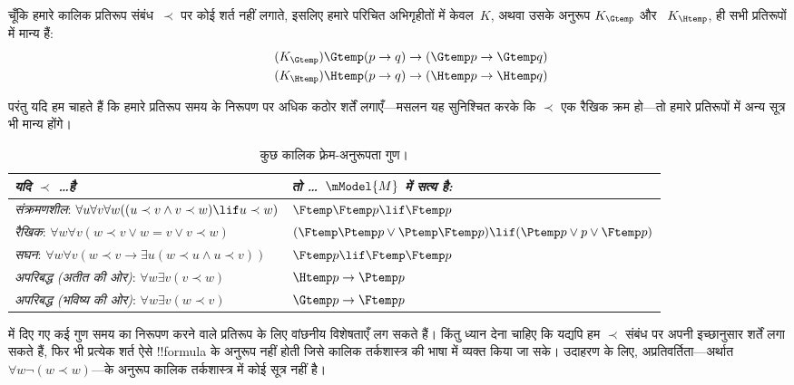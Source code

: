 \documentclass[../../../include/open-logic-section]{subfiles}
\begin{document}


चूँकि हमारे कालिक प्रतिरूप संबंध~$\prec$ पर कोई शर्त नहीं लगाते, इसलिए हमारे
परिचित अभिगृहीतों में केवल~$K$, अथवा उसके अनुरूप $K_{\Gtemp}$ और
~$K_{\Htemp}$, ही सभी प्रतिरूपों में मान्य हैं:
\begin{align*}
\tag{$K_{\Gtemp}$}  \Gtemp (p \to q) & \to (\Gtemp p \to \Gtemp q)\\
\tag{$K_{\Htemp}$}  \Htemp (p \to q) & \to (\Htemp p \to \Htemp q)
\end{align*}

परंतु यदि हम चाहते हैं कि हमारे प्रतिरूप समय के निरूपण पर अधिक कठोर शर्तें
लगाएँ---मसलन यह सुनिश्चित करके कि $\prec$ एक रैखिक क्रम हो---तो हमारे
प्रतिरूपों में अन्य सूत्र भी मान्य होंगे।

\begin{table}[t]
  \begin{tabular}{| p{} || p{} |}
    \hline
    {\emph{यदि $\prec$ \dots है}} & {\emph{तो \dots~$\mModel{M}$ में सत्य है:}} \\
    \hline \hline
    \emph{संक्रमणशील}: \newline
    $\forall u \forall v \forall w ((u \prec v \land v \prec w) \lif u \prec w)$ & 
    $\Ftemp \Ftemp p \lif \Ftemp p$  \\
    \hline 
    \emph{रैखिक}: \newline
    $\forall w \forall v (w \prec v \lor w = v \lor v \prec w)$ &  
    $(\Ftemp \Ptemp  p \lor \Ptemp \Ftemp p) \lif (\Ptemp p \lor p \lor \Ftemp p)$\\
    \hline
    \emph{सघन}: \newline
    $\forall w \forall v (w \prec v \to \exists u(w \prec u \land u \prec v))$ &  
    $\Ftemp p \lif \Ftemp \Ftemp p$ \\
    \hline
    \emph{अपरिबद्ध (अतीत की ओर)}: \newline
    $\forall w \exists v( v \prec w)$ &  
    $\Htemp p \to \Ptemp p$ \\
    \hline
    \emph{अपरिबद्ध (भविष्य की ओर)}: \newline
    $\forall w \exists v( w \prec v)$ &  
    $\Gtemp p \to \Ftemp p$ \\
    \hline
  \end{tabular}
  \caption{कुछ कालिक फ़्रेम-अनुरूपता गुण।}
\end{table} 

 में दिए गए कई गुण समय का निरूपण करने वाले प्रतिरूप
के लिए वांछनीय विशेषताएँ लग सकते हैं। किंतु ध्यान देना चाहिए कि यद्यपि हम
$\prec$ संबंध पर अपनी इच्छानुसार शर्तें लगा सकते हैं, फिर भी प्रत्येक शर्त
ऐसे !!{formula} के अनुरूप नहीं होती जिसे कालिक तर्कशास्त्र की भाषा में व्यक्त
किया जा सके। उदाहरण के लिए, अप्रतिवर्तिता---अर्थात
$\forall w \lnot (w \prec w)$---के अनुरूप कालिक तर्कशास्त्र में कोई सूत्र
नहीं है।
\end{document}
